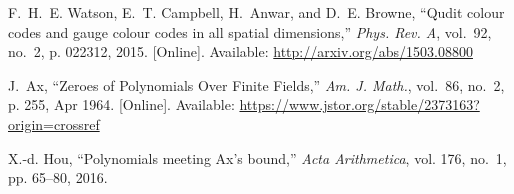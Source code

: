 \documentclass[twoside,romanappendices]{IEEEtran}
\begin{document}
\begin{thebibliography}{10}
\BIBentryALTinterwordspacing
F.~H.~E. Watson, E.~T. Campbell, H.~Anwar, and D.~E. Browne, ``Qudit colour
  codes and gauge colour codes in all spatial dimensions,'' \emph{Phys. Rev.
  A}, vol.~92, no.~2, p. 022312, 2015. [Online]. Available:
  \url{http://arxiv.org/abs/1503.08800}
\BIBentrySTDinterwordspacing

\BIBentryALTinterwordspacing
J.~Ax, ``{Zeroes of Polynomials Over Finite Fields},'' \emph{Am. J. Math.},
  vol.~86, no.~2, p. 255, Apr 1964. [Online]. Available:
  \url{https://www.jstor.org/stable/2373163?origin=crossref}
\BIBentrySTDinterwordspacing

X.-d. Hou, ``Polynomials meeting {A}x’s bound,'' \emph{Acta Arithmetica},
  vol. 176, no.~1, pp. 65--80, 2016.

\end{thebibliography}






\newpage

\appendices

\onecolumn


%
%
%
%
%
\end{document}
